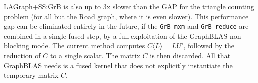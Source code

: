 LAGraph+SS:GrB is also up to 3x slower than the GAP for the triangle counting
problem (for all but the Road graph, where it is even slower).  This
performance gap can be eliminated entirely in the future, if the \verb'GrB_mxm'
and \verb'GrB_reduce' are combined in a single fused step, by a full
exploitation of the GraphBLAS non-blocking mode.  The current method computes
$C \langle L \rangle = LU'$, followed by the reduction of $C$ to a single
scalar.  The matrix $C$ is then discarded.  All that GraphBLAS needs is a fused
kernel that does not explicitly instantiate the temporary matrix $C$.

